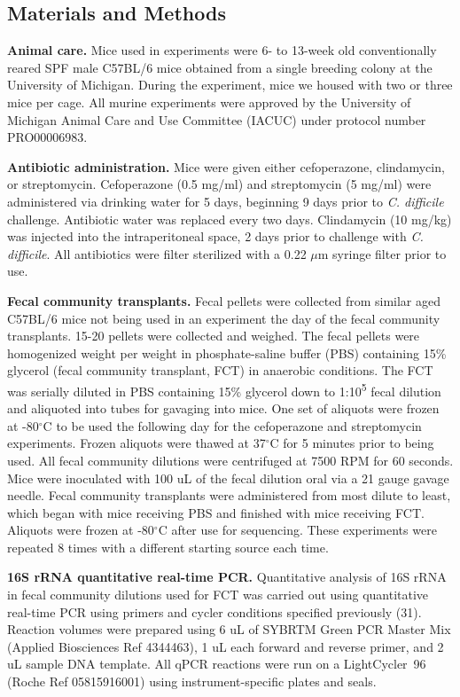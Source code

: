 \documentclass[
  12pt,
]{article}
\begin{document}
\hypertarget{materials-and-methods}{%
\subsection{Materials and Methods}\label{materials-and-methods}}

\textbf{Animal care.} Mice used in experiments were 6- to 13-week old
conventionally reared SPF male C57BL/6 mice obtained from a single
breeding colony at the University of Michigan. During the experiment,
mice we housed with two or three mice per cage. All murine experiments
were approved by the University of Michigan Animal Care and Use
Committee (IACUC) under protocol number PRO00006983.

\textbf{Antibiotic administration.} Mice were given either cefoperazone,
clindamycin, or streptomycin. Cefoperazone (0.5 mg/ml) and streptomycin
(5 mg/ml) were administered via drinking water for 5 days, beginning 9
days prior to \emph{C. difficile} challenge. Antibiotic water was
replaced every two days. Clindamycin (10 mg/kg) was injected into the
intraperitoneal space, 2 days prior to challenge with \emph{C.
difficile}. All antibiotics were filter sterilized with a 0.22 \(\mu\)m
syringe filter prior to use.

\textbf{Fecal community transplants.} Fecal pellets were collected from
similar aged C57BL/6 mice not being used in an experiment the day of the
fecal community transplants. 15-20 pellets were collected and weighed.
The fecal pellets were homogenized weight per weight in phosphate-saline
buffer (PBS) containing 15\% glycerol (fecal community transplant, FCT)
in anaerobic conditions. The FCT was serially diluted in PBS containing
15\% glycerol down to 1:10\textsuperscript{5} fecal dilution and
aliquoted into tubes for gavaging into mice. One set of aliquots were
frozen at -80\(^\circ\)C to be used the following day for the
cefoperazone and streptomycin experiments. Frozen aliquots were thawed
at 37\(^\circ\)C for 5 minutes prior to being used. All fecal community
dilutions were centrifuged at 7500 RPM for 60 seconds. Mice were
inoculated with 100 uL of the fecal dilution oral via a 21 gauge gavage
needle. Fecal community transplants were administered from most dilute
to least, which began with mice receiving PBS and finished with mice
receiving FCT. Aliquots were frozen at -80\(^\circ\)C after use for
sequencing. These experiments were repeated 8 times with a different
starting source each time.

\textbf{16S rRNA quantitative real-time PCR.} Quantitative analysis of
16S rRNA in fecal community dilutions used for FCT was carried out using
quantitative real-time PCR using primers and cycler conditions specified
previously (31). Reaction volumes were prepared using 6 uL of SYBRTM
Green PCR Master Mix (Applied Biosciences Ref 4344463), 1 uL each
forward and reverse primer, and 2 uL sample DNA template. All qPCR
reactions were run on a LightCycler\textregistered ~96 (Roche Ref
05815916001) using instrument-specific plates and seals.
\end{document}
